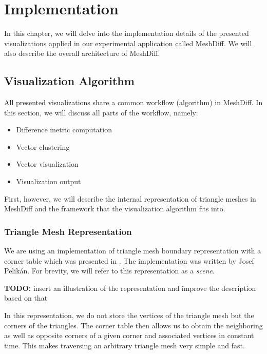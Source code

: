 \chapter{Implementation}

In this chapter, we will delve into the implementation details of the presented visualizations applied in our experimental application called MeshDiff. We will also describe the overall architecture of MeshDiff.

\section{Visualization Algorithm}
\label{sec:implementation_algorithm}

All presented visualizations share a common workflow (algorithm) in MeshDiff. In this section, we will discuss all parts of the workflow, namely:

\begin{itemize}
\item Difference metric computation
\item Vector clustering
\item Vector visualization
\item Visualization output
\end{itemize}

First, however, we will describe the internal representation of triangle meshes in MeshDiff and the framework that the visualization algorithm fits into.

\subsection{Triangle Mesh Representation}
\label{sec:mesh_representation}

We are using an implementation of triangle mesh boundary representation with a corner table which was presented in \citet{Corner03}. The implementation was written by Josef Pelikán. For brevity, we will refer to this representation as a {\it scene}.

{\bf TODO:} insert an illustration of the representation and improve the description based on that

In this representation, we do not store the vertices of the triangle mesh but the corners of the triangles. The corner table then allows us to obtain the neighboring as well as opposite corners of a given corner and associated vertices in constant time. This makes traversing an arbitrary triangle mesh very simple and fast.


